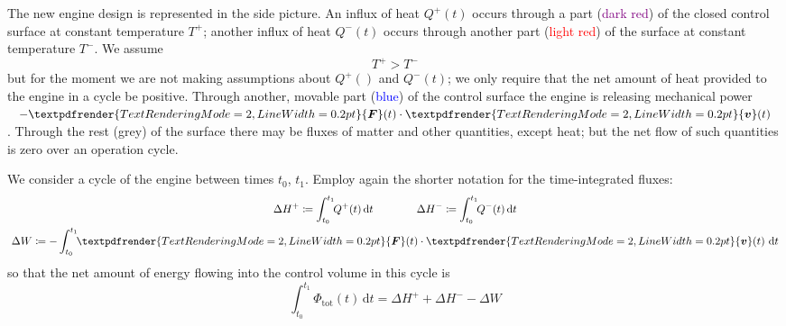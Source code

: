 \documentclass[a4paper,12pt,%
onecolumn,oneside,%
british%
]{memoir}
\renewcommand*{\bm}[1]{\textpdfrender{TextRenderingMode=2,LineWidth=0.2pt}{\boldsymbol{#1}}}
\newcommand*{\di}{\mathrm{d}}%
\newcommand*{\incr}{\Delta}%
\newcommand*{\defd}{\coloneqq}
\renewcommand*{\|}[1][]{\nonscript\:#1\vert\nonscript\:\mathopen{}}
\newcommand*{\yv}{\bm{v}}
\newcommand*{\yti}{t_{0}}
\newcommand*{\ytf}{t_{1}}
\newcommand*{\yH}{\varPhi}%
\newcommand*{\yQp}{Q^{+}}%
\newcommand*{\yQm}{Q^{-}}%
\newcommand*{\yhep}{\incr H^{+}}%
\newcommand*{\yhem}{\incr H^{-}}%
\newcommand*{\yW}{\incr W}%
\newcommand*{\yF}{\bm{F}}
\newcommand*{\yT}{T}%
\newcommand*{\yTp}{\yT^{+}}%
\newcommand*{\yTm}{\yT^{-}}%
\begin{document}
The new engine design is represented in the side picture. An influx of heat $\yQp(t)$ occurs through a part (\textcolor{purple}{dark red}) of the closed control surface at constant temperature $\yTp$; another influx of heat $\yQm(t)$ occurs through another part (\textcolor{red}{light red}) of the surface at constant temperature $\yTm$. We assume
%
%
\begin{equation*}
  \yTp > \yTm
\end{equation*}
but for the moment we are not making assumptions about $\yQp()$ and $\yQm(t)$; we only require that the net amount of heat provided to the engine in a cycle be positive. Through another, movable part (\textcolor{blue}{blue}) of the control surface the engine is releasing mechanical power $-\yF(t)\cdot\yv(t)$. Through the rest (\textcolor{midgrey}{grey}) of the surface there may be fluxes of matter and other quantities, except heat; but the net flow of such quantities is zero over an operation cycle.

We consider a cycle of the engine between times $\yti$, $\ytf$. Employ again the shorter notation for the time-integrated fluxes:
\begin{equation*}
  \begin{gathered}
    \yhep \defd \int_{\yti}^{\ytf}\!\!\yQp(t)\,\di t
    \qquad\qquad
    \yhem \defd \int_{\yti}^{\ytf}\!\!\yQm(t)\,\di t
    \\
    \yW \defd -\int_{\yti}^{\ytf}\!\!\yF(t)\cdot\yv(t)\ \di t
  \end{gathered}
\end{equation*}
so that the net amount of energy flowing into the control volume in this cycle is
\begin{equation*}
  \int_{\yti}^{\ytf}\!\!\yH_{\text{tot}}(t)\,\di t =
 \yhep + \yhem -\yW
\end{equation*}
\end{document}
